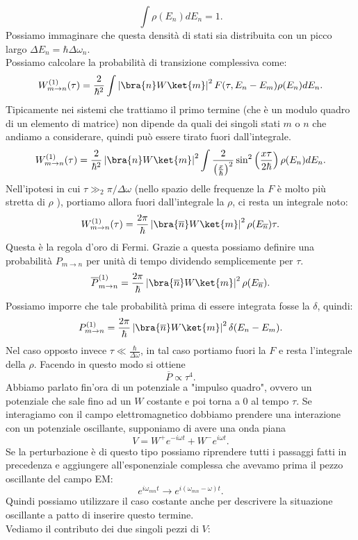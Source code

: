 \[
    \int\rho(E_n) dE_n = 1
.\] 
Possiamo immaginare che questa densità di stati sia distribuita con un picco largo $\Delta E_n = \hbar \Delta\omega_n $. \\
Possiamo calcolare la probabilità di transizione complessiva come:
\[
    W^{(1)}_{m\to n}(\tau) =
    \frac{2}{\hbar ^2}\int\left|\bra{n}W \ket{m}\right|^2 F(\tau, E_n-E_m)\rho(E_n) dE_n 
.\] 
Tipicamente nei sistemi che trattiamo il primo termine (che è un modulo quadro di un elemento di matrice) non dipende da quali dei singoli stati $m$ o $n$  che andiamo a considerare, quindi può essere tirato fuori dall'integrale.
\[
    W^{(1)}_{m\to n}(\tau) =
    \frac{2}{\hbar ^2}\left|\bra{n}W \ket{m}\right|^2\int\frac{2}{\left(\frac{x}{\hbar }\right)^2}\sin^2\left(\frac{x\tau}{2\hbar }\right) \rho(E_n) dE_n
.\] 
Nell'ipotesi in cui $\tau\gg_2\pi /\Delta\omega$ (nello spazio delle frequenze la $F$ è molto più stretta di $\rho$  ), portiamo allora fuori dall'integrale la $\rho$, ci resta un integrale noto:
\[
    W^{(1)}_{m\to n}(\tau) =
    \frac{2\pi}{\hbar}\left|\bra{\overline{n}}W \ket{m}\right|^2\rho(E_{\overline{n}})\tau 
.\] 
Questa è la regola d'oro di Fermi. Grazie a questa possiamo definire una probabilità $P_{m\to n}$ per unità di tempo dividendo semplicemente per $\tau$.
\[
    \overline{P}_{m\to n}^{(1) } =
    \frac{2\pi}{\hbar}\left|\bra{\overline{n}}W \ket{m}\right|^2\rho(E_{\overline{n}})
.\] 
Possiamo imporre che tale probabilità prima di essere integrata fosse la $\delta$, quindi:
\[
    P_{m\to n}^{(1) } =
    \frac{2\pi}{\hbar}\left|\bra{\overline{n}}W \ket{m}\right|^2\delta (E_n-E_m) 
.\] 
Nel caso opposto invece $\tau\ll\frac{\hbar }{\Delta\omega}$, in tal caso portiamo fuori la $F$ e resta l'integrale della $\rho$. Facendo in questo modo si ottiene 
\[
\overline{P} \propto \tau^4
.\] 
Abbiamo parlato fin'ora di un potenziale a "impulso quadro", ovvero un potenziale che sale fino ad un $W$  costante e poi torna a 0 al tempo $\tau$. Se interagiamo con il campo elettromagnetico dobbiamo prendere una interazione con un potenziale oscillante, supponiamo di avere una onda piana
\[
V=W^+ e^{-i\omega t} + W^- e^{i\omega t} 
.\] 
Se la perturbazione è di questo tipo possiamo riprendere tutti i passaggi fatti in precedenza e aggiungere all'esponenziale complessa che avevamo prima il pezzo oscillante del campo EM:
\[
    e^{i\omega_{mn}t} \to e^{i(\omega_{mn}-\omega)t }
.\] 
Quindi possiamo utilizzare il caso costante anche per descrivere la situazione oscillante a patto di inserire questo termine.\\
Vediamo il contributo dei due singoli pezzi di $V$:
